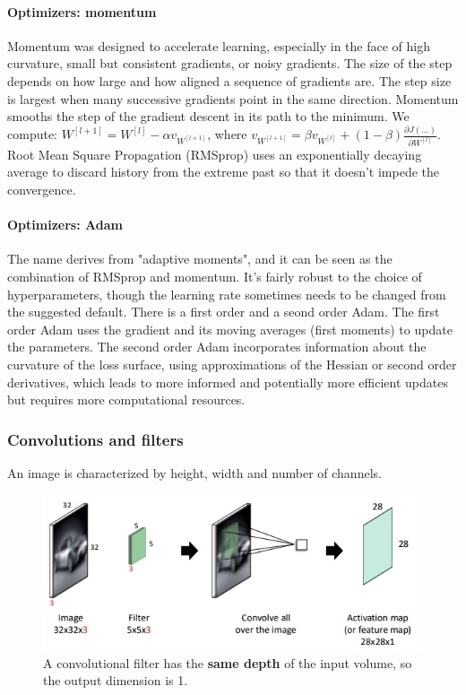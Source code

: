 \paragraph{Optimizers: momentum}
Momentum was designed to accelerate learning, especially in the face of high curvature, small but consistent gradients, or noisy gradients.
The size of the step depends on how large and how aligned a sequence of gradients are.
The step size is largest when many successive gradients point in the same direction.
Momentum smooths the step of the gradient descent in its path to the minimum.
We compute: $W^{[l+1]} = W^{[l]} - \alpha v_{W^{[l + 1]}}$, where $v_{W^{[l + 1]}} = \beta v_{W^{[l]}} + (1-\beta) \frac{\partial J(...)}{\partial W^{[l]}}$.
Root Mean Square Propagation (RMSprop) uses an exponentially decaying average to discard history from the extreme past so that it doesn't impede the convergence.

\paragraph{Optimizers: Adam}
The name derives from "adaptive moments", and it can be seen as the combination of RMSprop and momentum.
It's fairly robust to the choice of hyperparameters, though the learning rate sometimes needs to be changed from the suggested default.
There is a first order and a seond order Adam.
The first order Adam uses the gradient and its moving averages (first moments) to update the parameters.
The second order Adam incorporates information about the curvature of the loss surface, using approximations of the Hessian or second order derivatives, which leads to more informed and potentially more efficient updates but requires more computational resources.

\subsubsection{Convolutions and filters}
An image is characterized by height, width and number of channels.

\begin{figure}[htbp]
  \centering
  \includegraphics[width=0.8\linewidth]{./img/convolution_filter.jpg}
  \caption{A convolutional filter has the \textbf{same depth} of the input volume, so the output dimension is 1.}
\end{figure}

